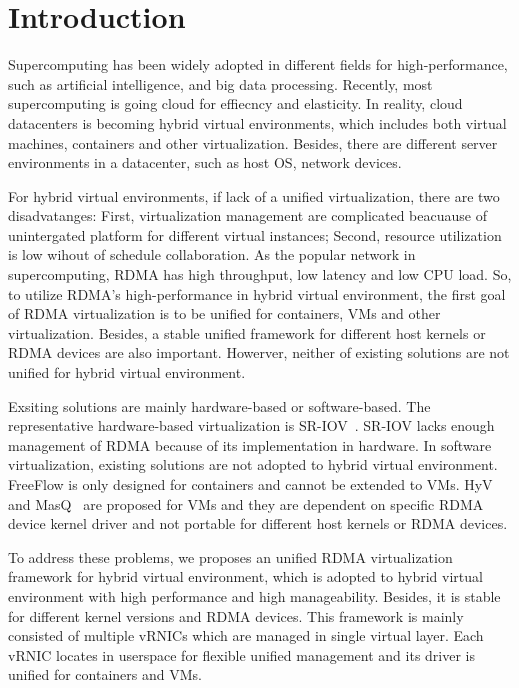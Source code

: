 \section{Introduction}
Supercomputing has been widely adopted in different fields for high-performance, such as artificial intelligence, and big data processing. Recently, most supercomputing is going cloud for effiecncy and elasticity. In reality, cloud datacenters is becoming hybrid virtual environments, which includes both virtual machines, containers and other virtualization. Besides, there are different server environments in a datacenter, such as host OS, network devices.

For hybrid virtual environments, if lack of a unified virtualization, there are two disadvatanges: First, virtualization management are complicated beacuause of unintergated platform for different virtual instances; Second, resource utilization is low wihout of schedule collaboration. As the popular network in supercomputing, RDMA has high throughput, low latency and low CPU load. So, to utilize RDMA's high-performance in hybrid virtual environment, the first goal of RDMA virtualization is to be unified for containers, VMs and other virtualization. Besides, a stable unified framework for different host kernels or RDMA devices are also important. Howerver, neither of existing solutions are not unified for hybrid virtual environment.

Exsiting solutions are mainly hardware-based or software-based. The representative hardware-based virtualization is SR-IOV~\cite{sr-iov}. SR-IOV lacks enough management of RDMA because of its implementation in hardware. In software virtualization, existing solutions are not adopted to hybrid virtual environment. FreeFlow is only designed for containers and cannot be extended to VMs.  HyV~\cite{pfefferle2015hybrid} ~\cite{pfefferle2014vverbs} and MasQ~\cite{he2020masq} are proposed for VMs and they are dependent on specific RDMA device kernel driver and not portable for different host kernels or RDMA devices.

To address these problems, we proposes an unified RDMA virtualization framework for hybrid virtual environment, which is adopted to hybrid virtual environment with high performance and high manageability. Besides, it is stable for different kernel versions and RDMA devices. This framework is mainly consisted of multiple vRNICs which are managed in single virtual layer. Each vRNIC locates in userspace for flexible unified management and its driver is unified for containers and VMs.

